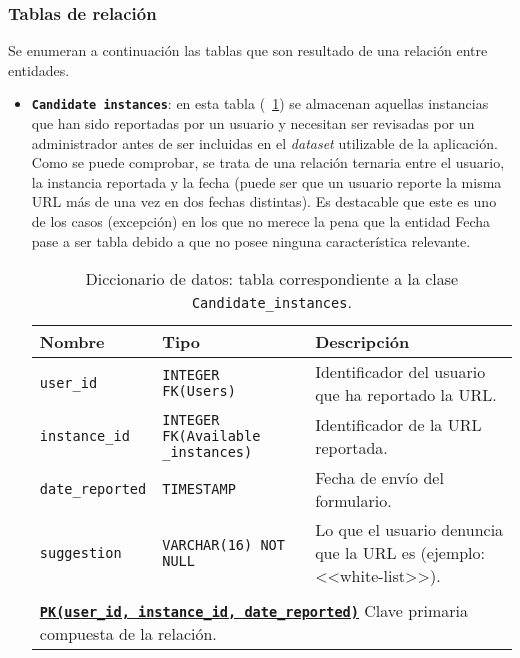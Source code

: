 \subsubsection{Tablas de relación}

Se enumeran a continuación las tablas que son resultado de una relación entre entidades.

\begin{itemize}
	\item \textbf{\texttt{Candidate instances}}: en esta tabla (~\ref{datadic:candidate_instances}) se almacenan aquellas instancias que han sido reportadas por un usuario y necesitan ser revisadas por un administrador antes de ser incluidas en el \textit{dataset} utilizable de la aplicación. Como se puede comprobar, se trata de una relación ternaria entre el usuario, la instancia reportada y la fecha (puede ser que un usuario reporte la misma URL más de una vez en dos fechas distintas). Es destacable que este es uno de los casos (excepción) en los que no merece la pena que la entidad Fecha pase a ser tabla debido a que no posee ninguna característica relevante.
	
		\begin{table}
		\small
		\begin{centering}
			\begin{tabular}{@{}p{7em} p{7em} p{18em}@{}}
				\toprule
				\textbf{Nombre} & \textbf{Tipo} & \textbf{Descripción}\\
				\midrule
				\texttt{user\_id} & \texttt{INTEGER FK(Users)} & Identificador del usuario que ha reportado la URL. \\
				\texttt{instance\_id} & \texttt{INTEGER FK(Available \_instances)} & Identificador de la URL reportada. \\
				\texttt{date\_reported} & \texttt{TIMESTAMP} & Fecha de envío del formulario.     \\
				\texttt{suggestion} & \texttt{VARCHAR(16) NOT NULL} & Lo que el usuario denuncia que la URL es (ejemplo: <<white-list>>).   \\\\
				\multicolumn{3}{l}{\texttt{\textbf{\underline{PK(user\_id, instance\_id, date\_reported)}}} Clave primaria compuesta de la relación.} \\
				\bottomrule
			\end{tabular}
		\end{centering}
		\caption[Diccionario de datos: Candidate\_instances]{Diccionario de datos: tabla correspondiente a la clase \texttt{Candidate\_instances}.}
		\label{datadic:candidate_instances}
		\end{table}


\end{itemize}

